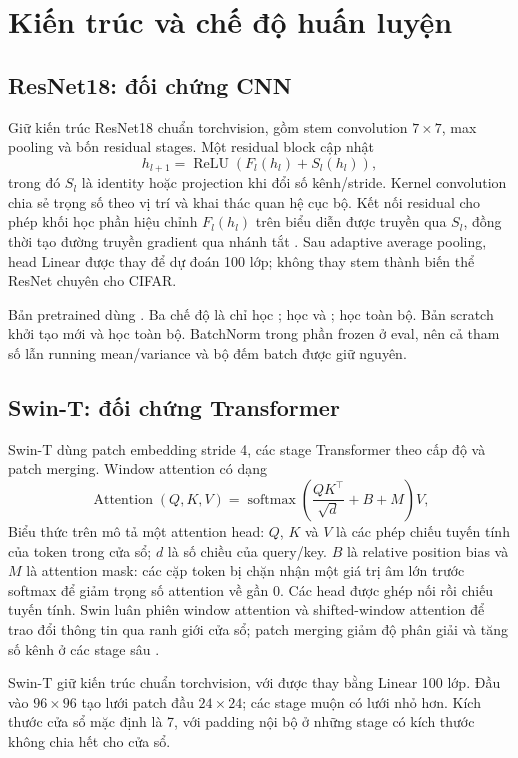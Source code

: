 \documentclass[12pt,a4paper]{report}
\begin{document}
\chapter{Kiến trúc và chế độ huấn luyện}
\section{ResNet18: đối chứng CNN}
Giữ kiến trúc ResNet18 chuẩn torchvision, gồm stem convolution $7\times7$,
max pooling và bốn residual stages. Một residual block cập nhật
\begin{equation}
h_{l+1}=\operatorname{ReLU}\left(F_l(h_l)+S_l(h_l)\right),
\end{equation}
trong đó $S_l$ là identity hoặc projection khi đổi số kênh/stride. Kernel
convolution chia sẻ trọng số theo vị trí và khai thác quan hệ cục bộ. Kết nối residual cho phép khối học phần hiệu chỉnh $F_l(h_l)$ trên biểu diễn được truyền qua $S_l$, đồng thời tạo đường truyền gradient qua nhánh tắt \cite{resnet}. Sau
adaptive average pooling, head Linear được thay để dự đoán 100 lớp; không
thay stem thành biến thể ResNet chuyên cho CIFAR.

Bản pretrained dùng . Ba chế độ là
chỉ học ; học  và ; học toàn bộ. Bản scratch
khởi tạo mới và học toàn bộ. BatchNorm trong phần frozen ở eval, nên cả
tham số lẫn running mean/variance và bộ đếm batch được giữ nguyên.

\section{Swin-T: đối chứng Transformer}
Swin-T dùng patch embedding stride 4, các stage Transformer theo cấp độ và
patch merging. Window attention có dạng
\begin{equation}
\operatorname{Attention}(Q,K,V)
=\operatorname{softmax}\left(\frac{QK^\top}{\sqrt{d}}+B+M\right)V,
\end{equation}
Biểu thức trên mô tả một attention head: $Q$, $K$ và $V$ là các phép chiếu tuyến tính của token trong cửa sổ; $d$ là số chiều của query/key. $B$ là relative position bias và $M$ là attention mask: các cặp token bị chặn nhận một giá trị âm lớn trước softmax để giảm trọng số attention về gần 0. Các head được ghép nối rồi chiếu tuyến tính. Swin luân phiên window attention và shifted-window attention để trao đổi thông tin qua ranh giới cửa sổ; patch merging giảm độ phân giải và tăng số kênh ở các stage sâu \cite{swin}.

Swin-T giữ kiến trúc chuẩn torchvision, với  được thay bằng
Linear 100 lớp. Đầu vào $96\times96$ tạo lưới patch đầu $24\times24$;
các stage muộn có lưới nhỏ hơn. Kích thước cửa sổ mặc định là 7, với padding
nội bộ ở những stage có kích thước không chia hết cho cửa sổ.
\end{document}
